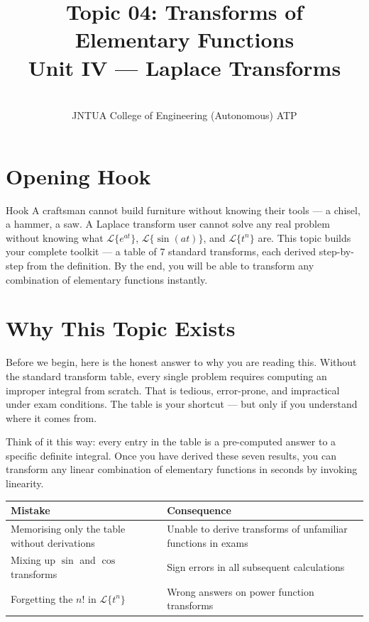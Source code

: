 \documentclass[12pt,a4paper]{article}
\title{Topic 04: Transforms of Elementary Functions \\
       \large Unit IV --- Laplace Transforms}
\author{ \\
        JNTUA College of Engineering (Autonomous) ATP}
\date{}
\begin{document}
\maketitle
\tableofcontents
\newpage

\section{Opening Hook}

\begin{curiositybox}{Hook}
A craftsman cannot build furniture without knowing their tools --- a chisel, a hammer, a saw.
A Laplace transform user cannot solve any real problem without knowing what
$\mathcal{L}\{e^{at}\}$, $\mathcal{L}\{\sin(at)\}$, and $\mathcal{L}\{t^n\}$ are.
This topic builds your complete toolkit --- a table of 7 standard transforms, each derived
step-by-step from the definition. By the end, you will be able to transform any combination
of elementary functions instantly.
\end{curiositybox}

\section{Why This Topic Exists}

Before we begin, here is the honest answer to why you are reading this. Without the standard
transform table, every single problem requires computing an improper integral from scratch.
That is tedious, error-prone, and impractical under exam conditions. The table is your
shortcut --- but only if you understand where it comes from.

Think of it this way: every entry in the table is a pre-computed answer to a specific
definite integral. Once you have derived these seven results, you can transform any linear
combination of elementary functions in seconds by invoking linearity.

\begin{center}
\begin{tabular}{@{}ll@{}}
\toprule
\textbf{Mistake} & \textbf{Consequence} \\
\midrule
Memorising only the table without derivations & Unable to derive transforms of unfamiliar functions in exams \\
Mixing up $\sin$ and $\cos$ transforms & Sign errors in all subsequent calculations \\
Forgetting the $n!$ in $\mathcal{L}\{t^n\}$ & Wrong answers on power function transforms \\
\bottomrule
\end{tabular}
\end{center}
\end{document}
